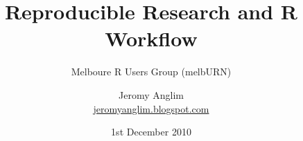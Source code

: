 

\usepackage[overlay, absolute]{textpos}


\title{Reproducible Research and R Workflow}
\subtitle{Melboure R Users Group (melbURN)}
\author{Jeromy Anglim\\
	\href{http://jeromyanglim.blogspot.com}{jeromyanglim.blogspot.com}}
\date{1st December 2010}


\mode*
\begin{frame}
\titlepage

\end{frame}





